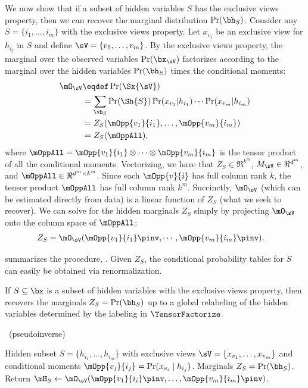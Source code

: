 We now show that if a subset of hidden variables $S$ has the exclusive views property,
then we can recover the marginal distribution $\Pr(\bh_S)$.
Consider any $S = \{i_1, \ldots, i_m\}$ with the exclusive views property. Let
  $x_{v_j}$ be an exclusive view for $h_{i_j}$ in $S$ and define $\sV
  = \{v_1, \ldots, v_m\}$. %
By the exclusive views property,
the marginal over the observed variables $\Pr(\bx_\sV)$
factorizes according to the marginal over the hidden variables $\Pr(\bh_S)$
times the conditional moments:
\begin{align*}
  \mO_\sV 
  &\eqdef \Pr(\Sx{\sV}) \\
  &= \sum_{\vh_S} \Pr(\Sh{S}) 
                    \Pr(x_{v_1} | h_{i_1}) \cdots \Pr(x_{v_m} | h_{i_m}) \\
  &= Z_{S}(\mOpp{v_1}{i_1},\dots,\mOpp{v_m}{i_m}) \\
  &= Z_{S}(\mOppAll),
\end{align*}
where $\mOppAll = \mOpp{v_1}{i_1} \otimes \cdots \otimes \mOpp{v_m}{i_m}$ is the tensor product of
all the conditional moments.
Vectorizing, we have that
$Z_S \in \Re^{k^m}$,
$M_\sV \in \Re^{d^m}$,
and $\mOppAll \in \Re^{d^m \times k^m}$.
Since each $\mOpp{v}{i}$ has full column rank $k$,
the tensor product $\mOppAll$ has full column rank $k^m$.
Succinctly, $\mO_\sV$ (which can be estimated directly from data)
is a linear function of $Z_S$ (what we seek to recover).
We can solve for the hidden marginals $Z_S$ simply by projecting $\mO_\sV$ onto the column
space of $\mOppAll$:
\begin{align*}
  Z_{S} &= \mO_\sV(\mOpp{v_1}{i_1}\pinv,\cdots,\mOpp{v_m}{i_m}\pinv).
\end{align*}

 summarizes the procedure, \LearnMarginals.
Given $Z_S$, the conditional probability tables for $S$ can easily be
obtained via renormalization.
\begin{theorem}
If $S \subseteq \bx$ is a subset of hidden variables with the exclusive views property,
then  recovers the marginals $Z_S
= \Pr(\bh_S)$ up to a global relabeling of the hidden variables
determined by the labeling in $\TensorFactorize$.
\end{theorem}

\begin{algorithm}
  \caption{\LearnMarginals~(pseudoinverse)}
  \label{algo:learnMarginals}
  \begin{algorithmic}
    \REQUIRE Hidden subset $S = \{ h_{i_1}, \dots, h_{i_m} \}$ with exclusive views $\sV = \{ x_{v_1}, \dots, x_{v_m} \}$
    and conditional moments $\mOpp{v_j}{i_j} = \Pr(x_{v_i} \mid h_{i_j})$.
    \ENSURE Marginals $Z_S = \Pr(\bh_S)$.
      \STATE Return $\mH_S \gets \mO_{\sV}( \mOpp{v_1}{i_i}\pinv, \dots, {\mOpp{v_m}{i_m}}\pinv )$.
  \end{algorithmic}
\end{algorithm}

